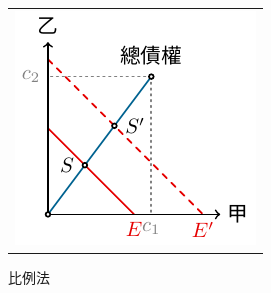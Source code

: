 \begin{center}
	\hfill
	\begin{tabular}{l}
		\includegraphics{divide/divide-proportional.pdf}
	\end{tabular}
	\hfill\textsf{比例法}
\end{center}
